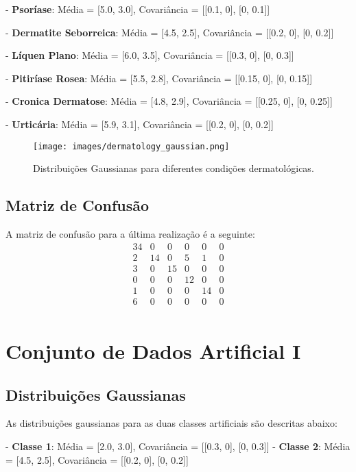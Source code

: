 \documentclass[12pt, a4paper]{report}
\begin{document}
- \textbf{Psoríase}: Média = [5.0, 3.0], Covariância = [[0.1, 0], [0, 0.1]]

- \textbf{Dermatite Seborreica}: Média = [4.5, 2.5], Covariância = [[0.2, 0], [0, 0.2]]

- \textbf{Líquen Plano}: Média = [6.0, 3.5], Covariância = [[0.3, 0], [0, 0.3]]

- \textbf{Pitiríase Rosea}: Média = [5.5, 2.8], Covariância = [[0.15, 0], [0, 0.15]]

- \textbf{Cronica Dermatose}: Média = [4.8, 2.9], Covariância = [[0.25, 0], [0, 0.25]]

- \textbf{Urticária}: Média = [5.9, 3.1], Covariância = [[0.2, 0], [0, 0.2]]

\begin{figure}[H]
\centering
\texttt{[image: images/dermatology\_gaussian.png]}
\caption{Distribuições Gaussianas para diferentes condições dermatológicas.}
\label{fig:gaussian_dermatology}
\end{figure}

\subsection{Matriz de Confusão}
A matriz de confusão para a última realização é a seguinte:
\[
\begin{array}{cccccc}
34 & 0 & 0 & 0 & 0 & 0 \\
2 & 14 & 0 & 5 & 1 & 0 \\
3 & 0 & 15 & 0 & 0 & 0 \\
0 & 0 & 0 & 12 & 0 & 0 \\
1 & 0 & 0 & 0 & 14 & 0 \\
6 & 0 & 0 & 0 & 0 & 0 \\
\end{array}
\]

\section{Conjunto de Dados Artificial I}

\subsection{Distribuições Gaussianas}
As distribuições gaussianas para as duas classes artificiais são descritas abaixo:

- \textbf{Classe 1}: Média = [2.0, 3.0], Covariância = [[0.3, 0], [0, 0.3]]
- \textbf{Classe 2}: Média = [4.5, 2.5], Covariância = [[0.2, 0], [0, 0.2]]
\end{document}
